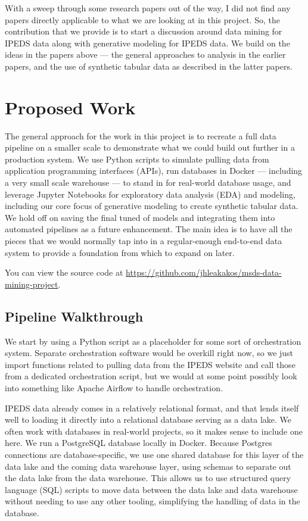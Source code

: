 \documentclass[sigconf, authorversion, nonacm]{acmart}
\begin{document}
    With a sweep through some research papers out of the way, I did not find any papers directly applicable to what we are looking at in this project. So, the contribution that we provide is to start a discussion around data mining for IPEDS data along with generative modeling for IPEDS data. We build on the ideas in the papers above --- the general approaches to analysis in the earlier papers, and the use of synthetic tabular data as described in the latter papers.

\section{Proposed Work}

    The general approach for the work in this project is to recreate a full data pipeline on a smaller scale to demonstrate what we could build out further in a production system. We use Python scripts to simulate pulling data from application programming interfaces (APIs), run databases in Docker --- including a very small scale warehouse --- to stand in for real-world database usage, and leverage Jupyter Notebooks for exploratory data analysis (EDA) and modeling, including our core focus of generative modeling to create synthetic tabular data. We hold off on saving the final tuned of models and integrating them into automated pipelines as a future enhancement. The main idea is to have all the pieces that we would normally tap into in a regular-enough end-to-end data system to provide a foundation from which to expand on later.

    You can view the source code at \href{https://github.com/jhleakakos/msds-data-mining-project}{https://github.com/jhleakakos/msds-data-mining-project}.

    \subsection{Pipeline Walkthrough}
        We start by using a Python script as a placeholder for some sort of orchestration system. Separate orchestration software would be overkill right now, so we just import functions related to pulling data from the IPEDS website and call those from a dedicated orchestration script, but we would at some point possibly look into something like Apache Airflow to handle orchestration.

        IPEDS data already comes in a relatively relational format, and that lends itself well to loading it directly into a relational database serving as a data lake. We often work with databases in real-world projects, so it makes sense to include one here. We run a PostgreSQL database locally in Docker. Because Postgres connections are database-specific, we use one shared database for this layer of the data lake and the coming data warehouse layer, using schemas to separate out the data lake from the data warehouse. This allows us to use structured query language (SQL) scripts to move data between the data lake and data warehouse without needing to use any other tooling, simplifying the handling of data in the database.
\end{document}

